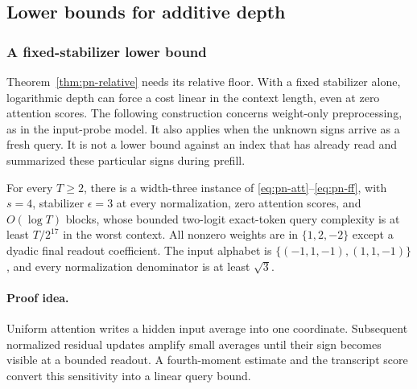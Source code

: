 \subsection{Lower bounds for additive depth}
\label{sec:pn-depth-lower}

\subsubsection{A fixed-stabilizer lower bound}

Theorem~\ref{thm:pn-relative} needs its relative floor. With a fixed
stabilizer alone, logarithmic depth can force a cost linear in the
context length, even at zero attention scores.
The following construction concerns weight-only preprocessing, as in the
input-probe model. It also applies when the unknown signs arrive as a
fresh query. It is not a lower bound against an index that has already
read and summarized these particular signs during prefill.

\begin{theorem}
\label{thm:pn-absolute-lower}
For every $T\ge2$, there is a width-three instance of
\eqref{eq:pn-att}--\eqref{eq:pn-ff}, with $s=4$, stabilizer
$\epsilon=3$ at every normalization, zero attention scores, and
$O(\log T)$ blocks, whose bounded two-logit exact-token query complexity
is at least $T/2^{17}$ in the worst context. All nonzero weights are in
$\{1,2,-2\}$ except a dyadic final readout coefficient. The input alphabet
is $\{(-1,1,-1),(1,1,-1)\}$, and every normalization denominator is at
least $\sqrt3$.
\end{theorem}
\paragraph{Proof idea.}
Uniform attention writes a hidden input average into one coordinate.
Subsequent normalized residual updates amplify small averages until their
sign becomes visible at a bounded readout. A fourth-moment estimate and the
transcript score convert this sensitivity into a linear query bound.

